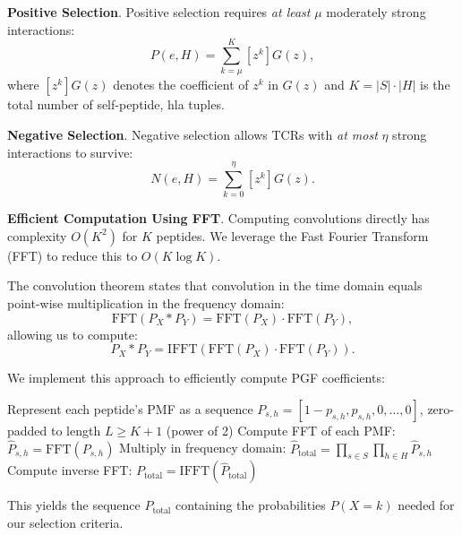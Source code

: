\documentclass[11pt]{article}
\begin{document}
\textbf{Positive Selection}. Positive selection requires \textit{at least} $\mu$ moderately strong interactions:
\begin{equation}
P(e,H) = \sum_{k=\mu}^{K} [z^k] G(z),
\end{equation}
where $[z^k] G(z)$ denotes the coefficient of $z^k$ in $G(z)$ and $K = |S| \cdot |H|$ is the total number of self-peptide, hla tuples.

\textbf{Negative Selection}. Negative selection allows TCRs with \textit{at most} $\eta$ strong interactions to survive:
\begin{equation}
N(e,H) = \sum_{k=0}^{\eta} [z^k] G(z).
\end{equation}

\textbf{Efficient Computation Using FFT}. Computing convolutions directly has complexity $O(K^2)$ for $K$ peptides. We leverage the Fast Fourier Transform (FFT) to reduce this to $O(K \log K)$.

The convolution theorem states that convolution in the time domain equals point-wise multiplication in the frequency domain:
\begin{equation}
\text{FFT}(P_X * P_Y) = \text{FFT}(P_X) \cdot \text{FFT}(P_Y),
\end{equation}
allowing us to compute:
\begin{equation}
P_X * P_Y = \text{IFFT}(\text{FFT}(P_X) \cdot \text{FFT}(P_Y)).
\end{equation}

We implement this approach to efficiently compute PGF coefficients:

\begin{algorithm}[H]
\caption{FFT-based Computation of PGF Coefficients}
\begin{algorithmic}[1]
\STATE Represent each peptide's PMF as a sequence $P_{s,h} = [1-p_{s,h}, p_{s,h}, 0, \ldots, 0]$, zero-padded to length $L \geq K+1$ (power of 2)
\STATE Compute FFT of each PMF: $\hat{P}_{s,h} = \text{FFT}(P_{s,h})$
\STATE Multiply in frequency domain: $\hat{P}_{\text{total}} = \prod_{s \in S}\prod_{h \in H} \hat{P}_{s,h}$
\STATE Compute inverse FFT: $P_{\text{total}} = \text{IFFT}(\hat{P}_{\text{total}})$
\end{algorithmic}
\end{algorithm}

This yields the sequence $P_{\text{total}}$ containing the probabilities $P(X=k)$ needed for our selection criteria.
\end{document}
